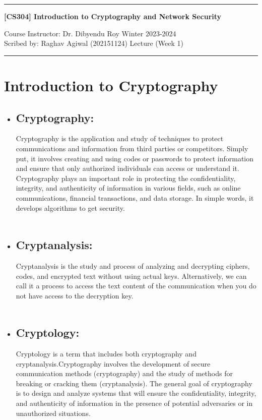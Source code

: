 \documentclass[11pt]{article}
\begin{document}
\noindent
\rule{\textwidth}{1pt}
\begin{center}
{\bf [CS304] Introduction to Cryptography and Network Security}
\end{center}
Course Instructor: Dr. Dibyendu Roy \hfill Winter 2023-2024\\
Scribed by: Raghav Agiwal (202151124) \hfill Lecture (Week 1\))
\\
\rule{\textwidth}{1pt}

\section{Introduction to Cryptography}

\begin{itemize}
    \item \subsection{Cryptography:} 
Cryptography is the application and study of techniques to protect communications and information from third parties or competitors. Simply put, it involves creating and using codes or passwords to protect information and ensure that only authorized individuals can access or understand it. Cryptography plays an important role in protecting the confidentiality, integrity, and authenticity of information in various fields, such as online communications, financial transactions, and data storage. In simple words, it develops algorithms to get security.\\\\
    
    \item \subsection{Cryptanalysis:}
Cryptanalysis is the study and process of analyzing and decrypting ciphers, codes, and encrypted text without using actual keys. Alternatively, we can call it a process to access the text content of the communication when you do not have access to the decryption key.\\\\
    \item \subsection{Cryptology:}
Cryptology is a term that includes both cryptography and cryptanalysis.Cryptography involves the development of secure communication methods (cryptography) and the study of methods for breaking or cracking them (cryptanalysis). The general goal of cryptography is to design and analyze systems that will ensure the confidentiality, integrity, and authenticity of information in the presence of potential adversaries or in unauthorized situations.
\end{itemize}
\end{document}
